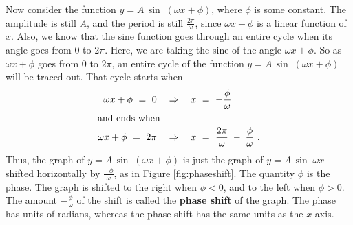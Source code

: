 Now consider the function $y=A\,\sin\;(\omega x + \phi)$, where $\phi$ is some constant. The
amplitude is still $A$, and the period is still $\frac{2\pi}{\omega}$, since $\omega x + \phi$ is a
linear function of $x$. Also, we know that the sine function goes through an entire cycle when its
angle goes from $0$ to $2\pi$. Here, we are taking the sine of the angle $\omega x + \phi$. So as
$\omega x + \phi$ goes from $0$ to $2\pi$, an entire cycle of the function
$y=A\,\sin\;(\omega x + \phi)$ will be traced out. That cycle starts when
\begin{align*}
 \omega x + \phi ~=~ 0 \quad&\Rightarrow\quad x ~=~ -\frac{\phi}{\omega}\\
\intertext{and ends when}
 \omega x + \phi ~=~ 2\pi \quad&\Rightarrow\quad x ~=~ \frac{2\pi}{\omega}\;-\;\frac{\phi}{\omega}~.
\end{align*}
Thus, the graph of $y=A\,\sin\;(\omega x + \phi)$ is just the graph of $y=A\,\sin\;\omega x$
shifted horizontally by $\frac{-\phi}{\omega}$, as in Figure \ref{fig:phaseshift}. The quantity $\phi$ is the phase. The graph is
shifted to the right when $\phi <0$, and to the left when $\phi >0$. The amount
$-\frac{\phi}{\omega}$ of the shift is called the \textbf{phase shift} of the
graph.  The phase has units of radians, whereas the phase shift has the same units as the $x$ axis.

